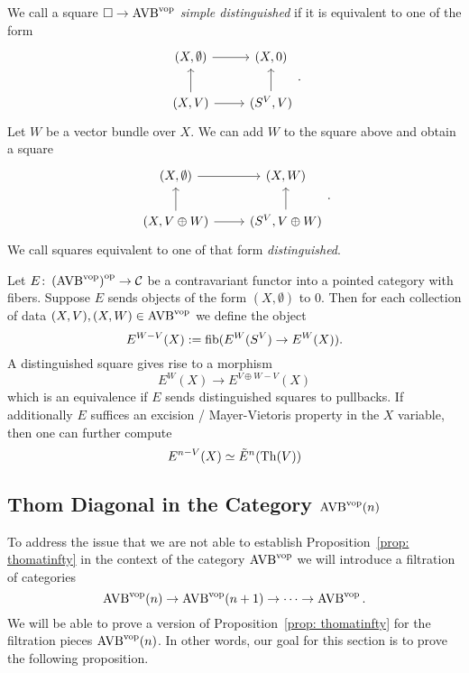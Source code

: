 \begin{definition} 
    We call a square $\square \to \operatorname{AVB}^{\mathrm{vop}}$ \emph{simple distinguished} if it is equivalent to one of the 
    form 
    \[\begin{tikzcd}
        {(X,\emptyset)} & {(X,0)} \\
        {(X,V)} & {(S^V,V)}
        \arrow[from=2-1, to=1-1]
        \arrow[from=1-1, to=1-2]
        \arrow[from=2-1, to=2-2]
        \arrow[from=2-2, to=1-2]
    \end{tikzcd}.\]
    Let $W$ be a vector bundle over $X$. We can add $W$ to the square above and obtain a square 
    \[\begin{tikzcd}
        {(X,\emptyset)} & {(X,W)} \\
        {(X,V \oplus W)} & {(S^V,V \oplus W)}
        \arrow[from=2-1, to=1-1]
        \arrow[from=1-1, to=1-2]
        \arrow[from=2-1, to=2-2]
        \arrow[from=2-2, to=1-2]
    \end{tikzcd}.\]
    We call squares equivalent to one of that form \emph{distinguished}.     
\end{definition}
\begin{remark}
    Let $E \colon \left(\operatorname{AVB}^{\mathrm{vop}}\right)^{\mathrm{op}} \to \mathcal{C}$ be a contravariant functor into a pointed category 
    with fibers. Suppose $E$ sends objects of the form $(X,\emptyset)$ to $0$. 
    Then for each collection of data $(X,V),(X,W) \in \operatorname{AVB}^{\mathrm{vop}}$ we define the object
    \[
        E^{W - V}(X) := \operatorname*{fib}( E^{W}(S^V) \to E^{W}(X)).
    \]
    A distinguished square gives rise to a morphism 
    \[
        E^{W}(X) \to E^{V \oplus W - V}(X)  
    \]
    which is an equivalence if $E$ sends distinguished 
    squares to pullbacks.
    If additionally $E$ suffices an excision / Mayer-Vietoris property in the 
    $X$ variable, then one can further compute 
    \[
    E^{n - V}(X) \simeq \tilde{E}^n(\operatorname{Th}(V))    
    \]   
\end{remark}

\subsection{Thom Diagonal in the Category $\operatorname{AVB}^{\mathrm{vop}}(n)$}\label{sec:AVB(n)}

To address the issue that we are not able to establish Proposition~\ref{prop: thomatinfty}
in the context of the category $\operatorname{AVB}^{\mathrm{vop}}$ we will introduce a filtration of categories 
\[
  \operatorname{AVB}^{\mathrm{vop}}(n) \to \operatorname{AVB}^{\mathrm{vop}}(n+1) \to \dots \to \operatorname{AVB}^{\mathrm{vop}}.
\]
We will be able to prove a version of Proposition~\ref{prop: thomatinfty} for the filtration pieces $\operatorname{AVB}^{\mathrm{vop}}(n)$.
In other words, our goal for this section is to prove the following proposition.

